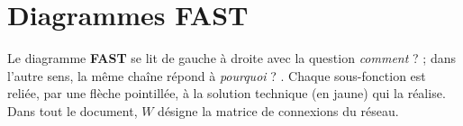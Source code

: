 \chapter{Diagrammes FAST}

Le diagramme \textbf{FAST} se lit de gauche à droite avec la question \og \emph{comment} ? \fg{} ; dans l'autre sens, la même chaîne répond à \og \emph{pourquoi} ? \fg. Chaque sous-fonction est reliée, par une flèche pointillée, à la solution technique (en jaune) qui la réalise. Dans tout le document, $W$ désigne la matrice de connexions du réseau.



